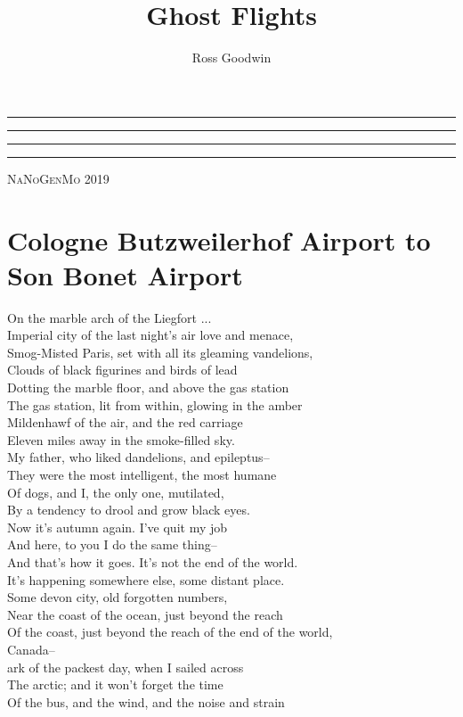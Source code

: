 \documentclass[smalldemyvopaper,11pt,twoside,onecolumn,openright,extrafontsizes]{memoir}
\title{Ghost Flights}
\author{Ross Goodwin}
\newcommand{\press}{NaNoGenMo 2019}
\newcommand*\halftitlepage{\begingroup %
  \setlength\drop{0.1\textheight}
  \begin{center}
  \vspace*{\drop}
  \rule{\textwidth}{0in}\par
  {\Large\textsc\thetitle\par}
  \rule{\textwidth}{0in}\par
  \vfill
  \end{center}
\endgroup}
\newlength\drop
\newcommand*\titleM{\begingroup %
  \setlength\drop{0.15\textheight}
  \begin{center}
  \vspace*{\drop}
  \rule{\textwidth}{0in}\par
  {\HUGE\textsc\thetitle\par}
  \rule{\textwidth}{0in}\par
  {\Large\textit\theauthor\par}
  \vfill
  {\Large\scshape\press}
  \end{center}
\endgroup}
\begin{document}
\pagestyle{empty}
\halftitlepage
\cleardoublepage
\titleM
\clearpage

\frontmatter
\pagestyle{mystyle}

\clearpage
\tableofcontents*

\mainmatter


\chapter{Cologne Butzweilerhof Airport to Son Bonet Airport}
On the marble arch of the Liegfort ...
\\Imperial city of the last night's air love and menace,
\\Smog-Misted Paris, set with all its gleaming vandelions,
\\Clouds of black figurines and birds of lead
\\Dotting the marble floor, and above the gas station
\\The gas station, lit from within, glowing in the amber
\\Mildenhawf of the air, and the red carriage
\\Eleven miles away in the smoke-filled sky.
\\My father, who liked dandelions, and epileptus--
\\They were the most intelligent, the most humane
\\Of dogs, and I, the only one, mutilated,
\\By a tendency to drool and grow black eyes.
\\Now it's autumn again. I've quit my job
\\And here, to you I do the same thing--
\\And that's how it goes. It's not the end of the world.
\\It's happening somewhere else, some distant place.
\\Some devon city, old forgotten numbers,
\\Near the coast of the ocean, just beyond the reach
\\Of the coast, just beyond the reach of the end of the world,
\\Canada--
\\ark of the packest day, when I sailed across
\\The arctic; and it won't forget the time
\\Of the bus, and the wind, and the noise and strain
\end{document}
